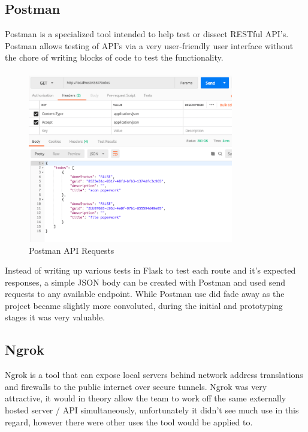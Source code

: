 \subsection{Postman}
Postman is a specialized tool intended to help test or dissect RESTful API's. Postman allows testing of API's via a very user-friendly user interface without the chore of writing blocks of code to test the functionality.

\paragraph{}

\begin{figure}[H]
	\caption{Postman API Requests}
	\label{image:postman}
	\centering
	\includegraphics[width=0.8\textwidth]{images/postman.png}
\end{figure}	

Instead of writing up various tests in Flask to test each route and it's expected responses, a simple JSON body can be created with Postman and used send requests to any available endpoint. While Postman use did fade away as the project became slightly more convoluted, during the initial and prototyping stages it was very valuable.

\subsection{Ngrok}
Ngrok is a tool that can expose local servers behind network address translations and firewalls to the public internet over secure tunnels. Ngrok was very attractive, it would in theory allow the team to work off the same externally hosted server / API simultaneously, unfortunately it didn't see much use in this regard, however there were other uses the tool would be applied to.

